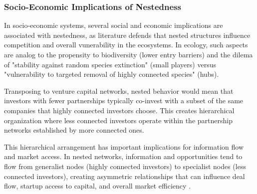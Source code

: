 


\subsubsection{Socio‑Economic Implications of Nestedness}

In socio‑economic systems, several social and economic implications are associated with nestedness, as literature defends that nested structures influence competition and overall vunerability in the  ecosystems. In ecology, such aspects are analog to the propensity to biodiversity (lower entry barriers) and the dilema of "stability against random species extinction" (small players) versus "vulnerability to targeted removal of highly connected species" (hubs).

Transposing to venture capital networks, nested behavior would mean that investors with fewer partnerships typically co-invest with a subset of the same companies that highly connected investors choose. This creates hierarchical organization where less connected investors operate within the partnership networks established by more connected ones.

This hierarchical arrangement has important implications for information flow and market access. In nested networks, information and opportunities tend to flow from generalist nodes (highly connected investors) to specialist nodes (less connected investors), creating asymmetric relationships that can influence deal flow, startup access to capital, and overall market efficiency \cite{Mariani2019}.

